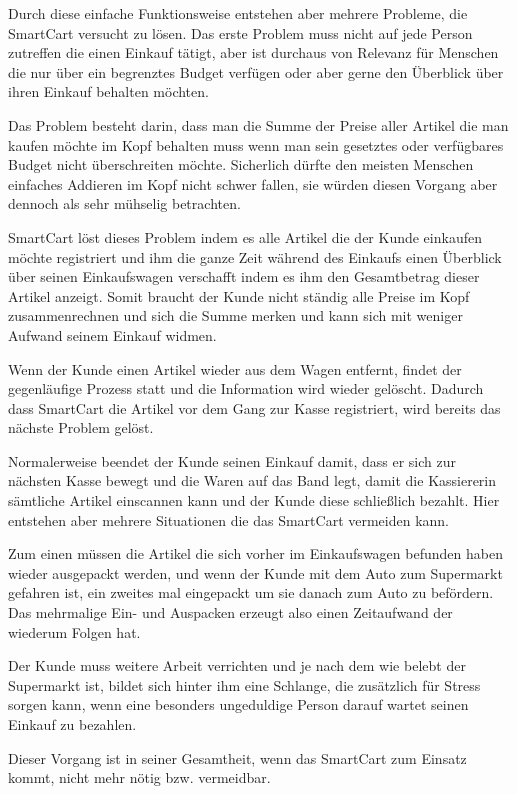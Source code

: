 \documentclass{sigchi}
\begin{document}
Durch diese einfache Funktionsweise entstehen aber mehrere Probleme, die SmartCart versucht zu lösen. Das erste Problem muss nicht auf jede Person zutreffen die einen Einkauf tätigt, aber ist durchaus von Relevanz für Menschen die nur über ein begrenztes Budget verfügen oder aber gerne den Überblick über ihren Einkauf behalten möchten. 

Das Problem besteht darin, dass man die Summe der Preise aller Artikel die man kaufen möchte im Kopf behalten muss wenn man sein gesetztes oder verfügbares Budget nicht überschreiten möchte. Sicherlich dürfte den meisten Menschen einfaches Addieren im Kopf nicht schwer fallen, sie würden diesen Vorgang aber dennoch als sehr mühselig betrachten. 

SmartCart löst dieses Problem indem es alle Artikel die der Kunde einkaufen möchte registriert und ihm die ganze Zeit während des Einkaufs einen Überblick über seinen Einkaufswagen verschafft indem es ihm den Gesamtbetrag dieser Artikel anzeigt. Somit braucht der Kunde nicht ständig alle Preise im Kopf zusammenrechnen und sich die Summe merken und kann sich mit weniger Aufwand seinem Einkauf widmen.
 
Wenn der Kunde einen Artikel wieder aus dem Wagen entfernt, findet der gegenläufige Prozess statt und die Information wird wieder gelöscht. Dadurch dass SmartCart die Artikel  vor dem Gang zur Kasse registriert, wird bereits das nächste Problem gelöst. 

Normalerweise beendet der Kunde seinen Einkauf damit, dass er sich zur nächsten Kasse bewegt und die Waren auf das Band legt, damit die Kassiererin sämtliche Artikel einscannen kann und der Kunde diese schließlich bezahlt. 
Hier entstehen aber mehrere Situationen die das SmartCart vermeiden kann. 

Zum einen müssen die Artikel die sich vorher im Einkaufswagen befunden haben wieder ausgepackt werden, und wenn der Kunde mit dem Auto zum Supermarkt gefahren ist, ein zweites mal eingepackt um sie danach zum Auto zu befördern. Das mehrmalige Ein- und Auspacken erzeugt also einen Zeitaufwand der wiederum Folgen hat. 

Der Kunde muss weitere Arbeit verrichten und je nach dem wie belebt der Supermarkt ist, bildet sich hinter ihm eine Schlange, die zusätzlich für Stress sorgen kann, wenn eine besonders ungeduldige Person darauf wartet seinen Einkauf zu bezahlen. 

Dieser Vorgang ist in seiner Gesamtheit, wenn das SmartCart zum Einsatz kommt, nicht mehr nötig bzw. vermeidbar. 
\end{document}
